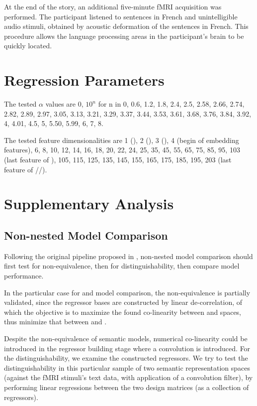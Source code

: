 At the end of the story, an additional five-minute fMRI acquisition was performed. The participant listened to sentences in French and unintelligible audio stimuli, obtained by acoustic deformation of the sentences in French. This procedure allows the language processing areas in the participant's brain to be quickly located.


\section{Regression Parameters}
\label{appsubsec:regressionparameters}

The tested \(\alpha\) values are 0, \(10^n\) for n in 0, 0.6, 1.2, 1.8, 2.4, 2.5, 2.58, 2.66, 2.74, 2.82, 2.89, 2.97, 3.05, 3.13, 3.21, 3.29, 3.37, 3.44, 3.53, 3.61, 3.68, 3.76, 3.84, 3.92, 4, 4.01, 4.5, 5, 5.50, 5.99, 6, 7, 8.

The tested feature dimensionalities are  1 (),   2 (),   3 (),   4 (begin of embedding features),   6,   8,  10,  12,  14,  16,  18,  20,  22,
        24,  25,  35,  45,  55,  65,  75,  85,  95, 103 (last feature of ), 105,  115, 125, 135,
       145, 155, 165, 175, 185, 195, 203 (last feature of \slash{}\slash{}).



\section{Supplementary Analysis}
\subsection{Non-nested Model Comparison} 
\label{appsubsec:nonnestedcompmeth}
Following the original pipeline proposed in \textcite{merkleTestingNonnestedStructural2016}, non-nested model comparison should first test for non-equivalence, then for distinguishability, then compare model performance. 

In the particular case for  and  model comparison, the non-equivalence is partially validated, since the regressor bases are constructed by linear de-correlation, of which the objective is to maximize the found co-linearity between  and  spaces, thus minimize that between  and .

Despite the non-equivalence of semantic models, numerical co-linearity could be introduced in the regressor building stage where a convolution is introduced. For the distinguishability, we examine the constructed regressors. We try to test the distinguishability in this particular sample of two semantic representation spaces (against the fMRI stimuli's text data, with application of a convolution filter), by performing linear regressions between the two design matrices (as a collection of regressors). 


